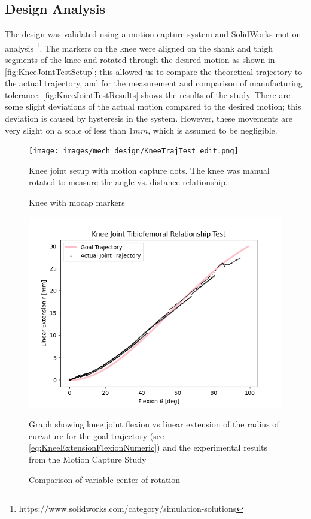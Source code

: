 \subsection{Design Analysis}

The design was validated using a motion capture system and SolidWorks motion analysis \footnote{https://www.solidworks.com/category/simulation-solutions}. The markers on the knee were aligned on the shank and thigh segments of the knee and rotated through the desired motion as shown in \autoref{fig:KneeJointTestSetup}; this allowed us to compare the theoretical trajectory to the actual trajectory, and for the measurement and comparison of manufacturing tolerance. \autoref{fig:KneeJointTestResults} shows the results of the study. There are some slight deviations of the actual motion compared to the desired motion; this deviation is caused by hysteresis in the system. However, these movements are very slight on a scale of less than $1mm$, which is assumed to be negligible.   



\begin{figure}[ht!]
    \centering
    \texttt{[image: images/mech\_design/KneeTrajTest\_edit.png]}
    \caption{Knee with mocap markers}{Knee joint setup with motion capture dots. The knee was manual rotated to measure the angle vs. distance relationship.}
    \label{fig:KneeJointTestSetup}
\end{figure}

\begin{figure}[ht!]
    \centering
    \includegraphics[scale=0.75]{images/mech_design/FlexionExtensionKneeJoint.png}
    \caption{Comparison of variable center of rotation}{Graph showing knee joint flexion vs linear extension of the radius of curvature for the goal trajectory (see \autoref{eq:KneeExtensionFlexionNumeric}) and the experimental results from the Motion Capture Study}
    \label{fig:KneeJointTestResults}
\end{figure}




